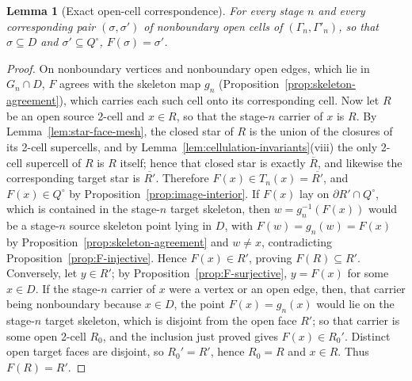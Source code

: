 \documentclass[11pt]{article}
\theoremstyle{mainplain}
\newtheorem{lemma}[theorem]{Lemma}
\theoremstyle{mainroman}
\theoremstyle{definition}
\numberwithin{equation}{section}
\begin{document}
\begin{lemma}[Exact open-cell correspondence]\label{lem:exact-cell-correspondence}
For every stage \(n\) and every corresponding pair \((\sigma,\sigma')\)
of nonboundary open cells of \((\Gamma_n,\Gamma'_n)\), so that
\(\sigma\subseteq D\) and \(\sigma'\subseteq Q^\circ\),
\(F(\sigma)=\sigma'\).
\end{lemma}
\begin{proof}
On nonboundary vertices and nonboundary open edges, which lie in
\(G_n\cap D\), \(F\) agrees with the skeleton map \(g_n\)
(Proposition~\ref{prop:skeleton-agreement}), which carries each such
cell onto its corresponding cell. Now
let \(R\) be an open source 2-cell and \(x\in R\), so that the
stage-\(n\) carrier of \(x\) is \(R\). By
Lemma~\ref{lem:star-face-mesh}, the closed star of \(R\) is the union
of the closures of its 2-cell supercells, and by
Lemma~\ref{lem:cellulation-invariants}\textup{(viii)} the only 2-cell
supercell of \(R\) is \(R\) itself; hence that closed star is exactly
\(\overline R\), and likewise the corresponding target star is
\(\overline{R'}\). Therefore \(F(x)\in T_n(x)=\overline{R'}\), and
\(F(x)\in Q^\circ\) by Proposition~\ref{prop:image-interior}. If
\(F(x)\) lay on \(\partial R'\cap Q^\circ\), which is contained in the
stage-\(n\) target skeleton, then \(w=g_n^{-1}(F(x))\) would be a
stage-\(n\) source skeleton point lying in \(D\), with
\(F(w)=g_n(w)=F(x)\) by Proposition~\ref{prop:skeleton-agreement} and
\(w\ne x\), contradicting Proposition~\ref{prop:F-injective}. Hence \(F(x)\in R'\), proving
\(F(R)\subseteq R'\). Conversely, let \(y\in R'\); by
Proposition~\ref{prop:F-surjective}, \(y=F(x)\) for some \(x\in D\).
If the stage-\(n\) carrier of \(x\) were a vertex or an open edge,
then, that carrier being nonboundary because \(x\in D\), the point
\(F(x)=g_n(x)\) would lie on the stage-\(n\) target skeleton, which is
disjoint from the open face \(R'\); so that carrier is some open 2-cell \(R_0\), and the inclusion
just proved gives \(F(x)\in R_0'\). Distinct open target faces are
disjoint, so \(R_0'=R'\), hence \(R_0=R\) and \(x\in R\). Thus
\(F(R)=R'\).
\end{proof}
\end{document}
